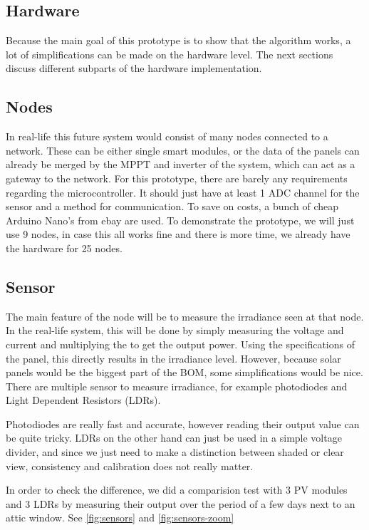 \documentclass[a4paper,journal]{DDREAM}
\begin{document}
\subsection{Hardware}\label{sec:implementation-hardware}
Because the main goal of this prototype is to show that the algorithm works, a lot of simplifications can be made on the hardware level.
The next sections discuss different subparts of the hardware implementation.

\subsection{Nodes}
In real-life this future system would consist of many nodes connected to a network.
These can be either single smart modules, or the data of the panels can already be merged by the MPPT and inverter of the system, which can act as a gateway to the network.
For this prototype, there are barely any requirements regarding the microcontroller.
It should just have at least 1 ADC channel for the sensor and a method for communication.
To save on costs, a bunch of cheap Arduino Nano's from ebay are used.
To demonstrate the prototype, we will just use 9 nodes, in case this all works fine and there is more time, we already have the hardware for 25 nodes.

\subsection{Sensor}
The main feature of the node will be to measure the irradiance seen at that node.
In the real-life system, this will be done by simply measuring the voltage and current and multiplying the to get the output power.
Using the specifications of the panel, this directly results in the irradiance level.
However, because solar panels would be the biggest part of the BOM, some simplifications would be nice.
There are multiple sensor to measure irradiance, for example photodiodes and Light Dependent Resistors (LDRs).

Photodiodes are really fast and accurate, however reading their output value can be quite tricky.
LDRs on the other hand can just be used in a simple voltage divider, and since we just need to make a distinction between shaded or clear view, consistency and calibration does not really matter.

In order to check the difference, we did a comparision test with 3 PV modules and 3 LDRs by measuring their output over the period of a few days next to an attic window.
See \autoref{fig:sensors} and \autoref{fig:sensors-zoom}
\end{document}
